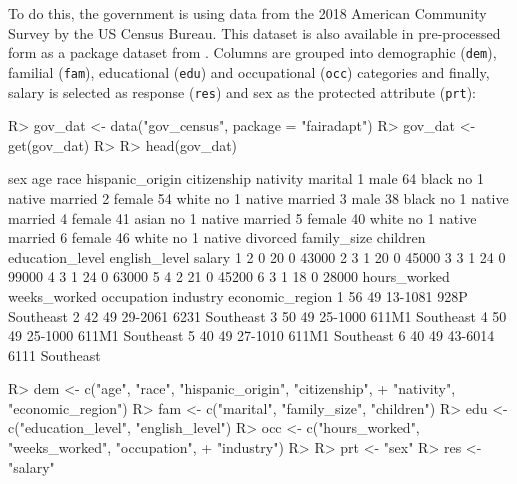 \documentclass[
  nojss]{jss}
\begin{document}
To do this, the government is using data from the 2018 American
Community Survey by the US Census Bureau. This dataset is also available
in pre-processed form as a package dataset from . Columns
are grouped into demographic (\texttt{dem}), familial (\texttt{fam}),
educational (\texttt{edu}) and occupational (\texttt{occ}) categories
and finally, salary is selected as response (\texttt{res}) and sex as
the protected attribute (\texttt{prt}):

\begin{CodeChunk}
\begin{CodeInput}
R> gov_dat <- data("gov_census", package = "fairadapt")
R> gov_dat <- get(gov_dat)
R> 
R> head(gov_dat)
\end{CodeInput}
\begin{CodeOutput}
     sex age  race hispanic_origin citizenship nativity  marital
1   male  64 black              no           1   native  married
2 female  54 white              no           1   native  married
3   male  38 black              no           1   native  married
4 female  41 asian              no           1   native  married
5 female  40 white              no           1   native  married
6 female  46 white              no           1   native divorced
  family_size children education_level english_level salary
1           2        0              20             0  43000
2           3        1              20             0  45000
3           3        1              24             0  99000
4           3        1              24             0  63000
5           4        2              21             0  45200
6           3        1              18             0  28000
  hours_worked weeks_worked occupation industry economic_region
1           56           49    13-1081     928P       Southeast
2           42           49    29-2061     6231       Southeast
3           50           49    25-1000    611M1       Southeast
4           50           49    25-1000    611M1       Southeast
5           40           49    27-1010    611M1       Southeast
6           40           49    43-6014     6111       Southeast
\end{CodeOutput}
\begin{CodeInput}
R> dem <- c("age", "race", "hispanic_origin", "citizenship",
+          "nativity", "economic_region")
R> fam <- c("marital", "family_size", "children")
R> edu <- c("education_level", "english_level")
R> occ <- c("hours_worked", "weeks_worked", "occupation",
+          "industry")
R> 
R> prt <- "sex"
R> res <- "salary"
\end{CodeInput}
\end{CodeChunk}
\end{document}
